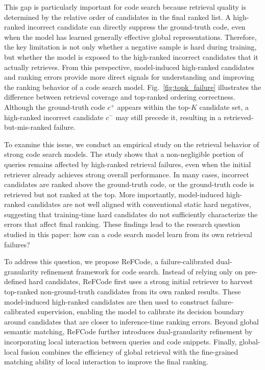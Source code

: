 \documentclass[10pt,conference]{IEEEtran}
\newcommand{\method}{ReFCode}
\begin{document}
This gap is particularly important for code search because retrieval quality is determined by the relative order of candidates in the final ranked list. A high-ranked incorrect candidate can directly suppress the ground-truth code, even when the model has learned generally effective global representations. Therefore, the key limitation is not only whether a negative sample is hard during training, but whether the model is exposed to the high-ranked incorrect candidates that it actually retrieves. From this perspective, model-induced high-ranked candidates and ranking errors provide more direct signals for understanding and improving the ranking behavior of a code search model. Fig.~\ref{fig:topk_failure} illustrates the difference between retrieval coverage and top-ranked ordering correctness. Although the ground-truth code $c^{+}$ appears within the top-$K$ candidate set, a high-ranked incorrect candidate $c^{-}$ may still precede it, resulting in a retrieved-but-mis-ranked failure.

To examine this issue, we conduct an empirical study on the retrieval behavior of strong code search models. The study shows that a non-negligible portion of queries remains affected by high-ranked retrieval failures, even when the initial retriever already achieves strong overall performance. In many cases, incorrect candidates are ranked above the ground-truth code, or the ground-truth code is retrieved but not ranked at the top. More importantly, model-induced high-ranked candidates are not well aligned with conventional static hard negatives, suggesting that training-time hard candidates do not sufficiently characterize the errors that affect final ranking. These findings lead to the research question studied in this paper: how can a code search model learn from its own retrieval failures?

To address this question, we propose \method{}, a failure-calibrated dual-granularity refinement framework for code search. Instead of relying only on pre-defined hard candidates, \method{} first uses a strong initial retriever to harvest top-ranked non-ground-truth candidates from its own ranked results. These model-induced high-ranked candidates are then used to construct failure-calibrated supervision, enabling the model to calibrate its decision boundary around candidates that are closer to inference-time ranking errors. Beyond global semantic matching, \method{} further introduces dual-granularity refinement by incorporating local interaction between queries and code snippets. Finally, global-local fusion combines the efficiency of global retrieval with the fine-grained matching ability of local interaction to improve the final ranking.
\end{document}
